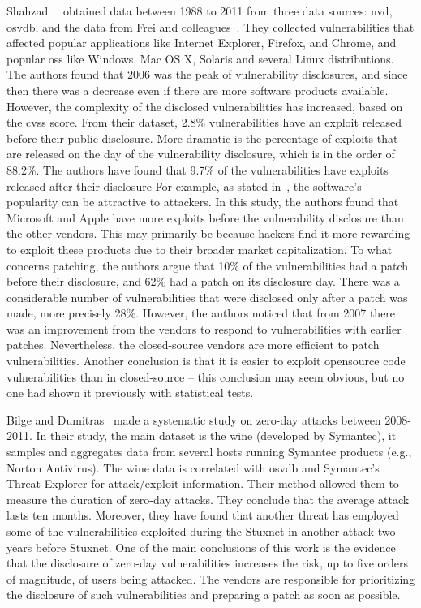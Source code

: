 Shahzad~\etal{}~\cite{Shahzad:2012} obtained data between 1988 to 2011 from three data sources: \gls{nvd}, \gls{osvdb}, and the data from Frei and colleagues~\cite{Frei:2006}. 
They collected vulnerabilities that affected popular applications like Internet Explorer, Firefox, and Chrome, and popular \glspl{os} like Windows, Mac OS X, Solaris and several Linux distributions. 
The authors found that 2006 was the peak of vulnerability disclosures, and since then there was a decrease even if there are more software products available. 
However, the complexity of the disclosed vulnerabilities has increased, based on the \gls{cvss} score. 
From their dataset, 2.8\% vulnerabilities have an exploit released before their public disclosure. 
More dramatic is the percentage of exploits that are released on the day of the vulnerability disclosure, which is in the order of 88.2\%. 
The authors have found that 9.7\% of the vulnerabilities have exploits released after their disclosure
For example, as stated in~\cite{Gorbenko:2011}, the software’s popularity can be attractive to attackers. 
In this study, the authors found that Microsoft and Apple have more exploits before the vulnerability disclosure than the other vendors. 
This may primarily be because hackers find it more rewarding to exploit these products due to their broader market capitalization.
To what concerns patching, the authors argue that 10\% of the vulnerabilities had a patch before their disclosure, and 62\% had a patch on its disclosure day. 
There was a considerable number of vulnerabilities that were disclosed only after a patch was made, more precisely 28\%. 
However, the authors noticed that from 2007 there was an improvement from the vendors to respond to vulnerabilities with earlier patches. 
Nevertheless, the closed-source vendors are more efficient to patch vulnerabilities. 
Another conclusion is that it is easier to exploit opensource code vulnerabilities than in closed-source – this conclusion may seem obvious, but no one had shown it previously with statistical tests.

Bilge and Dumitras~\cite{Bilge:2012} made a systematic study on zero-day attacks between 2008-2011.
In their study, the main dataset is the \gls{wine} (developed by Symantec), it samples and aggregates data from several hosts running Symantec products (e.g., Norton Antivirus).
The \gls{wine} data is correlated with \gls{osvdb} and Symantec's Threat Explorer for attack/exploit information.
Their method allowed them to measure the duration of zero-day attacks.
They conclude that the average attack lasts ten months. 
Moreover, they have found that another threat has employed some of the vulnerabilities exploited during the Stuxnet in another attack two years before Stuxnet.
One of the main conclusions of this work is the evidence that the disclosure of zero-day vulnerabilities increases the risk, up to five orders of magnitude, of users being attacked.
The vendors are responsible for prioritizing the disclosure of such vulnerabilities and preparing a patch as soon as possible. 


